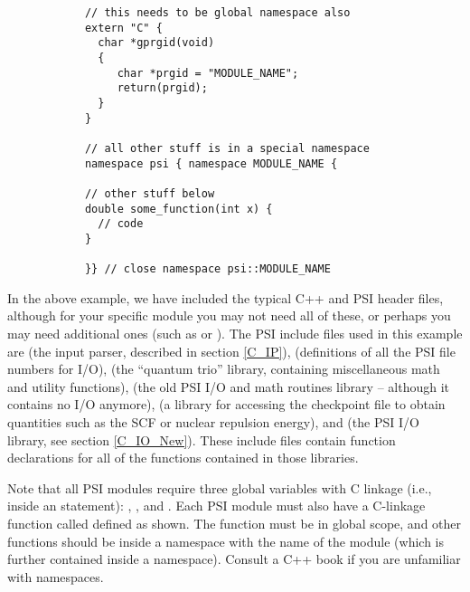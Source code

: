 \begin{verbatim}
            // this needs to be global namespace also
            extern "C" {
              char *gprgid(void)
              {
                 char *prgid = "MODULE_NAME";
                 return(prgid);
              }               
            }

            // all other stuff is in a special namespace
            namespace psi { namespace MODULE_NAME {
                
            // other stuff below
            double some_function(int x) {
              // code
            }

            }} // close namespace psi::MODULE_NAME
\end{verbatim}

In the above example, we have included the typical C++ and PSI
header files, although for your specific module you may not need
all of these, or perhaps you may need additional ones (such as
 or ).  The PSI include files used in this
example are  (the input parser, described
in section \ref{C_IP}),  (definitions of all the
PSI file numbers for I/O),  (the ``quantum
trio'' library, containing miscellaneous math and utility functions),
 (the old PSI I/O and math routines library
-- although it contains no I/O anymore),  (a
library for accessing the checkpoint file to obtain quantities such
as the SCF or nuclear repulsion energy), and 
(the PSI I/O library, see section \ref{C_IO_New}).  These include files
contain function declarations for all of the functions contained in
those libraries.

Note that all PSI modules require three global variables with C
linkage (i.e., inside an  statement): ,
, and .  Each PSI module must
also have a C-linkage function called  defined as shown.
The  function must be in global scope, and other functions
should be inside a namespace with the name of the module (which is further
contained inside a  namespace).  Consult a C++ book if you are
unfamiliar with namespaces.

